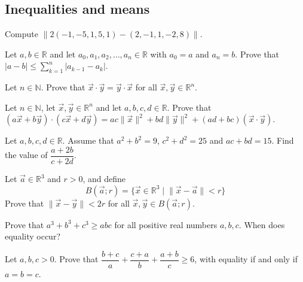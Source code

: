 \subsection*{Inequalities and means}

\begin{chapex}
Compute $\lVert 2({-1},{-5},1,5,1) - (2,{-1},1,{-2},8) \rVert$.
\end{chapex}

\begin{chapex}
Let $a,b \in \mathbb{R}$ and let $a_0,a_1,a_2,\dots,a_n \in \mathbb{R}$ with $a_0=a$ and $a_n=b$. Prove that $|a-b| \le \sum_{k=1}^n |a_{k-1} - a_k|$.
\end{chapex}

\begin{chapex}
Let $n \in \mathbb{N}$. Prove that $\vec x \cdot \vec y = \vec y \cdot \vec x$ for all $\vec x, \vec y \in \mathbb{R}^n$.
\end{chapex}

\begin{chapex}
Let $n \in \mathbb{N}$, let $\vec x, \vec y \in \mathbb{R}^n$ and let $a,b,c,d \in \mathbb{R}$. Prove that $(a \vec x + b \vec y) \cdot (c \vec x + d \vec y) = ac \lVert \vec x \rVert^2 + bd \lVert \vec y \rVert^2 + (ad+bc) (\vec x \cdot \vec y)$.
\end{chapex}

\begin{chapex}
Let $a,b,c,d \in \mathbb{R}$. Assume that $a^2+b^2 = 9$, $c^2+d^2=25$ and $ac+bd = 15$. Find the value of $\dfrac{a+2b}{c+2d}$.
\end{chapex}

\begin{chapex}
Let $\vec a \in \mathbb{R}^3$ and $r > 0$, and define
\[ B(\vec a; r) = \{ \vec x \in \mathbb{R}^3 \mid \lVert \vec x - \vec a \rVert < r \} \]
Prove that $\lVert \vec x - \vec y \rVert < 2r$ for all $\vec x, \vec y \in B(\vec a; r)$.
\end{chapex}

\begin{chapex}
Prove that $a^3+b^3+c^3 \ge abc$ for all positive real numbers $a,b,c$. When does equality occur?
\end{chapex}

\begin{chapex}
Let $a,b,c > 0$. Prove that $\dfrac{b+c}{a} + \dfrac{c+a}{b} + \dfrac{a+b}{c} \ge 6$, with equality if and only if $a=b=c$.
\end{chapex}


